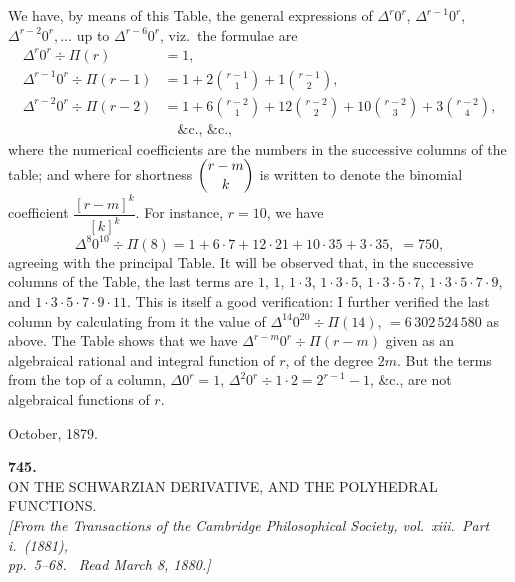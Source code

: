 \documentclass[11pt]{article}
\begin{document}
We have, by means of this Table, the general expressions of $\Delta^r 0^r$, $\Delta^{r-1} 0^r$, $\Delta^{r-2} 0^r,\ldots$
up to $\Delta^{r-6} 0^r$, viz.\ the formulae are
\begin{align*}
   \Delta^r 0^r \div \Pi(r) &= 1,\\
   \Delta^{r-1} 0^r \div \Pi(r-1) &= 1 + 2\binom{r-1}{1} + 1\binom{r-1}{2},\\
   \Delta^{r-2} 0^r \div \Pi(r-2) &= 1 + 6\binom{r-2}{1} + 12\binom{r-2}{2} + 10\binom{r-2}{3} + 3\binom{r-2}{4},\\
   &\quad \&\text{c., \&c.},
\end{align*}
where the numerical coefficients are the numbers in the successive columns of the
table; and where for shortness $\dbinom{r-m}{k}$ is written to denote the binomial coefficient
$\dfrac{[r-m]^k}{[k]^k}$. For instance, $r = 10$, we have
\[
   \Delta^8 0^{10} \div \Pi(8) = 1 + 6 \cdot 7 + 12 \cdot 21 + 10 \cdot 35 + 3 \cdot 35,\; = 750,
\]
agreeing with the principal Table. It will be observed that, in the successive columns
of the Table, the last terms are $1$, $1$, $1 \cdot 3$, $1 \cdot 3 \cdot 5$, $1 \cdot 3 \cdot 5 \cdot 7$, $1 \cdot 3 \cdot 5 \cdot 7 \cdot 9$, and
$1 \cdot 3 \cdot 5 \cdot 7 \cdot 9 \cdot 11$. This is itself a good verification: I further verified the last column
by calculating from it the value of $\Delta^{14} 0^{20} \div \Pi(14)$, $= 6\,302\,524\,580$ as above. The
Table shows that we have $\Delta^{r-m} 0^r \div \Pi(r - m)$ given as an algebraical rational and
integral function of $r$, of the degree $2m$. But the terms from the top of a column,
$\Delta 0^r = 1$, $\Delta^2 0^r \div 1 \cdot 2 = 2^{r-1} - 1$, \&c., are not algebraical functions of $r$.

\medskip

 October, 1879.

\bigskip

\begin{center}
\textbf{745.}\\[6pt]
\textsc{ON THE SCHWARZIAN DERIVATIVE, AND THE POLYHEDRAL\\
FUNCTIONS.}\\[6pt]
\textit{[From the Transactions of the Cambridge Philosophical Society, vol.\ xiii.\ Part i.\ (1881),\\
pp.\ 5--68. \ Read March 8, 1880.]}
\end{center}
\end{document}
